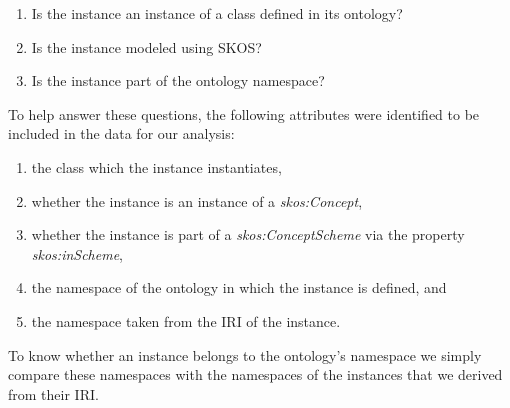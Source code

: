 \begin{enumerate}
    \item Is the instance an instance of a class defined in its ontology?
    \item Is the instance modeled using SKOS?
    \item Is the instance part of the ontology namespace?
\end{enumerate}

To help answer these questions, the following attributes were identified to be included in the data for our analysis:

\begin{flushleft}
\begin{enumerate}
    \item the class which the instance instantiates,
    \item whether the instance is an instance of a \textit{skos:Concept},
    \item whether the instance is part of a \textit{skos:ConceptScheme} via the property \textit{skos:inScheme},
    \item the namespace of the ontology in which the instance is defined, and
    \item the namespace taken from the IRI of the instance.
\end{enumerate}
\end{flushleft}

To know whether an instance belongs to the ontology's namespace we simply compare these namespaces with the namespaces of the instances that we derived from their IRI. %

